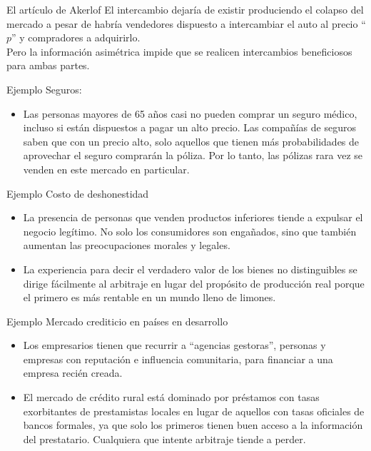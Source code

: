 \begin{frame}{El artículo de Akerlof}
	El intercambio dejaría de existir produciendo el colapso del mercado a pesar de habría vendedores dispuesto a intercambiar el auto al precio ``$p$'' y compradores a adquirirlo.\\[0.3cm]
	Pero la información asimétrica impide que se realicen intercambios beneficiosos para ambas partes.
\end{frame}
\begin{frame}{Ejemplo}
	Seguros:
		\begin{itemize}
			\item Las personas mayores de 65 años casi no pueden comprar un seguro médico, incluso si están dispuestos a pagar un alto precio. Las compañías de seguros saben que con un precio alto, solo aquellos que tienen más probabilidades de aprovechar el seguro comprarán la póliza. Por lo tanto, las pólizas rara vez se venden en este mercado en particular.
		\end{itemize}
\end{frame}
\begin{frame}{Ejemplo}
	Costo de deshonestidad
		\begin{itemize}
			\item La presencia de personas que venden productos inferiores tiende a expulsar el negocio legítimo. No solo los consumidores son engañados, sino que también aumentan las preocupaciones morales y legales.
			
			\item La experiencia para decir el verdadero valor de los bienes no distinguibles se dirige fácilmente al arbitraje en lugar del propósito de producción real porque el primero es más rentable en un mundo lleno de limones.
		\end{itemize}
\end{frame}
\begin{frame}{Ejemplo}
	Mercado crediticio en países en desarrollo
		\begin{itemize}
			\item Los empresarios tienen que recurrir a ``agencias gestoras'', personas y empresas con reputación e influencia comunitaria, para financiar a una empresa recién creada.
			\item El mercado de crédito rural está dominado por préstamos con tasas exorbitantes de prestamistas locales en lugar de aquellos con tasas oficiales de bancos formales, ya que solo los primeros tienen buen acceso a la información del prestatario. Cualquiera que intente arbitraje tiende a perder.
		\end{itemize}
\end{frame}
